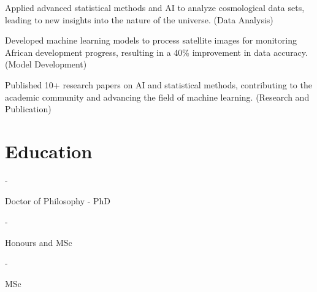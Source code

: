 \documentclass{modern} %
\begin{document}
    \vspace{0.10cm}
    \begin{onecolentry}
        \begin{highlights}
                            \item Applied advanced statistical methods and AI to analyze cosmological data sets, leading to new insights into the nature of the universe. (Data Analysis) 
                            \item Developed machine learning models to process satellite images for monitoring African development progress, resulting in a 40\% improvement in data accuracy. (Model Development) 
                            \item Published 10+ research papers on AI and statistical methods, contributing to the academic community and advancing the field of machine learning. (Research and Publication) 
                    \end{highlights}
    \end{onecolentry}

 

\section{Education}
    \begin{twocolentry}{
        \hfill  - 
    }
        \textbf{}
         
            Doctor of Philosophy {-} PhD 
         
    \end{twocolentry}
    \begin{onecolentry}
        \begin{highlights}
                         
             
                    \end{highlights}
    \end{onecolentry}
    \begin{twocolentry}{
        \hfill  - 
    }
        \textbf{}
         
            Honours and MSc 
         
    \end{twocolentry}
    \begin{onecolentry}
        \begin{highlights}
                         
             
                    \end{highlights}
    \end{onecolentry}
    \begin{twocolentry}{
        \hfill  - 
    }
        \textbf{}
         
            MSc 
         
    \end{twocolentry}
    \begin{onecolentry}
        \begin{highlights}
                         
             
                    \end{highlights}
    \end{onecolentry}
\end{document}
